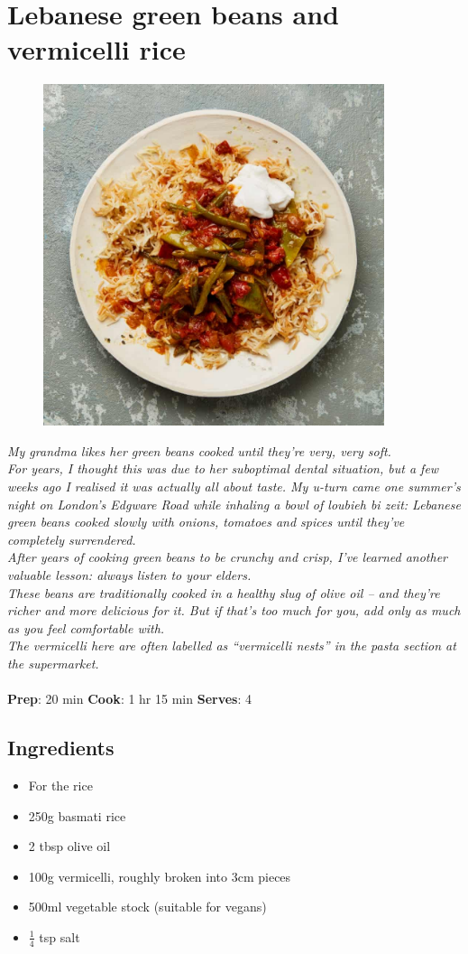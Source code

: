 \documentclass{book}
\begin{document}
\section{Lebanese green beans and vermicelli rice}
\begin{figure}
\centering\includegraphics[width=10cm,height=10cm,keepaspectratio]{Recipe_Pictures/Lebanese_green_beans_and_vermicelli_rice.png}
\end{figure}
\emph{My grandma likes her green beans cooked until they’re very, very soft.\\ 
For years, I thought this was due to her suboptimal dental situation, but a few weeks ago I realised it was actually all about taste. My u-turn came one summer’s night on London’s Edgware Road while inhaling a bowl of loubieh bi zeit: Lebanese green beans cooked slowly with onions, tomatoes and spices until they’ve completely surrendered.\\ 
After years of cooking green beans to be crunchy and crisp, I’ve learned another valuable lesson: always listen to your elders.\\ 
These beans are traditionally cooked in a healthy slug of olive oil – and they’re richer and more delicious for it. But if that’s too much for you, add only as much as you feel comfortable with.\\ 
The vermicelli here are often labelled as “vermicelli nests” in the pasta section at the supermarket.}\\\\ 
\textbf{Prep}: 20 min
\textbf{Cook}: 1 hr 15 min
\textbf{Serves}: 4
\subsection*{Ingredients}
\begin{itemize}
\item For the rice
\item 250g basmati rice
\item 2 tbsp olive oil
\item 100g vermicelli, roughly broken into 3cm pieces
\item 500ml vegetable stock (suitable for vegans)
\item $\frac{1}{4}$ tsp salt
\end{itemize}
\end{document}
